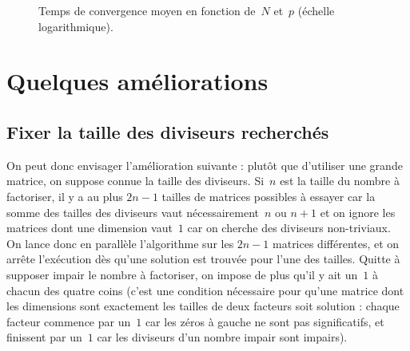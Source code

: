 \documentclass[11pt, openany, a4paper]{article}
\begin{document}
\begin{figure}
  \centering
  \caption{Temps de convergence moyen en fonction de~$N$ et~$p$ (échelle logarithmique).}
  \label{fig:p_ag}
\end{figure}  



\section{Quelques améliorations}

\subsection{Fixer la taille des diviseurs recherchés}

On peut donc envisager l'amélioration suivante : plutôt que d'utiliser une grande matrice, on suppose connue la taille des diviseurs. Si~$n$ est la taille du nombre à factoriser, il y a au plus $2n-1$ tailles de matrices possibles à essayer car la somme des tailles des diviseurs vaut nécessairement~$n$ ou $n+1$ et on ignore les matrices dont une dimension vaut~$1$ car on cherche des diviseurs non-triviaux. On lance donc en parallèle l'algorithme sur les $2n-1$ matrices différentes, et on arrête l'exécution dès qu'une solution est trouvée pour l'une des tailles. Quitte à supposer impair le nombre à factoriser, on impose de plus qu'il y ait un~$1$ à chacun des quatre coins (c'est une condition nécessaire pour qu'une matrice dont les dimensions sont exactement les tailles de deux facteurs soit solution : chaque facteur commence par un~$1$ car les zéros à gauche ne sont pas significatifs, et finissent par un~$1$ car les diviseurs d'un nombre impair sont impairs). 
\end{document}
